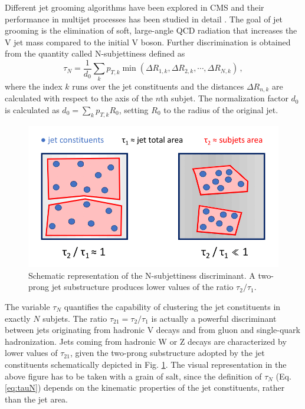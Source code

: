 Different jet grooming algorithms have been explored in CMS and their performance in multijet processes has been studied in detail \cite{Chatrchyan:2013vbb}. The goal of jet grooming is the elimination of soft, large-angle QCD radiation that increases the V jet mass compared to the initial V boson. Further discrimination is obtained from the quantity called N-subjettiness \cite{Thaler:2011gf} defined as
\begin{equation}
	\label{eq:tauN}
	\tau_N = \frac{1}{d_0} \sum_k{p_{T,k} \min(\Delta R_{1,k}, \Delta R_{2,k}, \cdots, \Delta R_{N,k})}\,, 
\end{equation}
where the index $k$ runs over the jet constituents and the distances $\Delta R_{n,k}$ are calculated with respect to the axis of the $n$th subjet. The normalization factor $d_0$ is calculated as $d_0 = \sum_k{p_{T,k}R_0}$, setting $R_0$ to the radius of the original jet. 

\begin{figure}[h]
\centering
\includegraphics[scale=0.35]{figures/experiment/visualTau21.png} 
\caption[Intuition of Tau21]{Schematic representation of the N-subjettiness discriminant. A two-prong jet substructure produces lower values of the ratio $\tau_2/\tau_1$.}
\label{visualtau21}
\end{figure}

The variable $\tau_N$ quantifies the capability of clustering the jet constituents in exactly $N$ subjets. The ratio $\tau_{21} = \tau_2 / \tau_1$ is actually a powerful discriminant between jets originating from hadronic V decays and from gluon and single-quark hadronization. Jets coming from hadronic W or Z decays are characterized by lower values of $\tau_{21}$, given the two-prong substructure adopted by the jet constituents schematically depicted in Fig. \ref{visualtau21}. The visual representation in the above figure has to be taken with a grain of salt, since the definition of $\tau_N$ (Eq. \ref{eq:tauN}) depends on the kinematic properties of the jet constituents, rather than the jet area.

